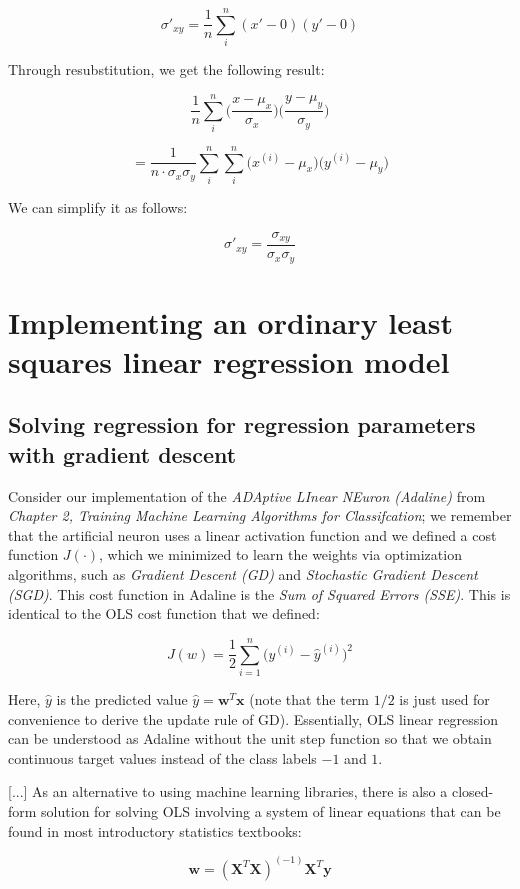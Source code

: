 \documentclass[letterpaper]{report}
\begin{document}
\[
\sigma'_{xy} = \frac{1}{n} \sum_{i}^{n} (x' - 0)(y' - 0)
\]

Through resubstitution, we get the following result:

\[
\frac{1}{n} \sum_{i}^{n} \Big( \frac{x - \mu_x}{\sigma_x}  \Big) \Big( \frac{y - \mu_y}{\sigma_y} \Big)
\]

\[
= \frac{1}{n \cdot \sigma_x \sigma_y} \sum^{n}_{i} \sum_{i}^{n} \big(x^{(i)} - \mu_x \big) \big(y^{(i)} - \mu_y \big)
\]
 
We can simplify it as follows:

\[
\sigma'_{xy} = \frac{\sigma_{xy}}{\sigma_x \sigma_y}
\]

\section{Implementing an ordinary least squares linear regression model}
\subsection{Solving regression for regression parameters with gradient descent}

Consider our implementation of the \textit{ADAptive LInear NEuron (Adaline)} from \textit{Chapter 2, Training Machine Learning Algorithms for Classifcation}; we remember that the artificial neuron uses a linear activation function and we defined a cost function $J (\cdot)$, which we minimized to learn the weights via optimization algorithms, such as \textit{Gradient Descent (GD)} and \textit{Stochastic Gradient Descent (SGD)}. This cost function in Adaline is the \textit{Sum of Squared Errors (SSE)}. This is identical to the OLS cost function that we defined:

\[
J(w) = \frac{1}{2} \sum_{i=1}^{n} \big( y^{(i)} -  \hat{y}^{(i)} \big)^2
\]

Here, $\hat{y}$ is the predicted value $\hat{y} = \mathbf{w}^T\mathbf{x}$  (note that the term $1/2$ is just used for convenience to derive the update rule of GD). Essentially, OLS linear regression can be understood as Adaline without the unit step function so that we obtain continuous target values instead of the class labels $-1$ and $1$.

[...] As an alternative to using machine learning libraries, there is also
a closed-form solution for solving OLS involving a system of linear equations that can be found in most introductory statistics textbooks:

\[
\mathbf{w} = (\mathbf{X}^T \mathbf{X})^{(-1)} \mathbf{X}^T \mathbf{y}
\]
\end{document}
